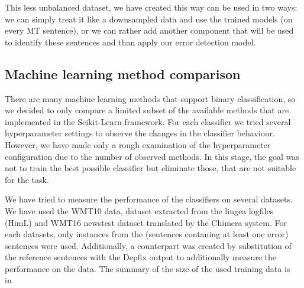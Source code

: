 This less unbalanced dataset, we have created this way can be used in two ways: we can simply treat
it like a downsampled data and use the trained models  (on every MT sentence),
or we can rather add another component that will be used to identify these  sentences
and than apply our error detection model.



\subsection{Machine learning method comparison}

There are many machine learning methods that support binary classification, so we
decided to only compare a limited subset of the available methods that are implemented
in the Scikit-Learn framework. For each classifier we tried several hyperparameter
settings to observe the changes in the classifier behaviour. However, we have made only
a rough examination of the hyperparameter configuration due to the number of observed
methods. In this stage, the goal was not to train the best possible classifier but
eliminate those, that are not suitable for the task.

We have tried to measure the performance of the classifiers on several datasets. We have used
the WMT10 data, dataset extracted from the lingea logfiles (HimL) and
WMT16 newstest dataset translated by the Chimera system.
For each datasets, only instances from the  (sentences contaning at least one error)
sentences were used.
Additionally, a counterpart was
created by substitution of the reference sentences with the Depfix output
to additionally measure the performance on the  data.
The summary of the size of the used training data is in~

